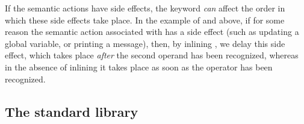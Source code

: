 \documentclass[onecolumn,11pt,nocopyrightspace,preprint]{sigplanconf}
\begin{document}
If the semantic actions have side effects, the \dinline keyword \emph{can}
affect the order in which these side effects take place. In the example of
 and  above, if for some reason the semantic action
associated with  has a side effect (such as updating a global variable,
or printing a message), then, by inlining , we delay this side effect,
which takes place \emph{after} the second operand has been recognized, whereas
in the absence of inlining it takes place as soon as the operator has been
recognized.


\subsection{The standard library}
\label{sec:library}
\end{document}
